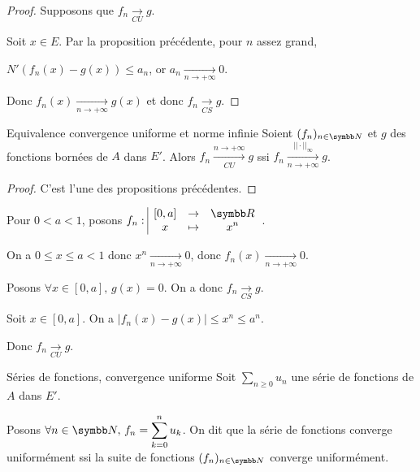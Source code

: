 
\begin{proof}
    Supposons que $f_n \xrightarrow[CU]{} g$.

    Soit $x \in E$. Par la proposition précédente, pour $n$ assez grand,

    $N'(f_n(x) - g(x)) \leqslant a_n$, or $a_n \xrightarrow[n\to +\infty]{} 0$.

    Donc $f_n(x) \xrightarrow[n\to +\infty]{} g(x)$ et donc $f_n \xrightarrow[CS]{} g$.
\end{proof}

\begin{proposition}{Equivalence convergence uniforme et norme infinie}{}
    Soient $(f_n)_{n \in \N}$ et $g$ des fonctions bornées de $A$ dans $E'$.
    Alors $f_n \xrightarrow[CU]{n \to + \infty} g$ ssi $\displaystyle f_n \xrightarrow[n \to + \infty]{||\cdot ||_{\infty}} g$.
\end{proposition}

\begin{proof}
    C'est l'une des propositions précédentes.
\end{proof}

\begin{exemple}
    Pour $0 < a < 1$, posons $\displaystyle \fonction{f_n}{[0, a]}{\R}{x}{x^n}$.


    \avspace On a $0 \leqslant x \leqslant a < 1$ donc $x^n \xrightarrow[n\to +\infty]{} 0$, donc 
    $f_n(x) \xrightarrow[n\to +\infty]{} 0$.

    Posons $\forall x \in [0, a], \, g(x) = 0$. On a donc $f_n \xrightarrow[CS]{} g$.


    \avspace Soit $x \in [0, a]$. On a $\displaystyle |f_n(x) - g(x)| \leqslant x^n \leqslant a^n$.

    Donc $f_n \xrightarrow[CU]{} g$.
\end{exemple}


\begin{definition}{Séries de fonctions, convergence uniforme}{}
    Soit $ \sum_{n \geqslant 0} u_n$ une série de fonctions de $A$ dans $E'$. 

    Posons $\displaystyle \forall n \in \N, \, f_n = \sum_{k = 0}^n u_k$. On dit que la série de fonctions converge 
    uniformément ssi la suite de fonctions $(f_n)_{n \in \N}$ converge uniformément.
\end{definition}

